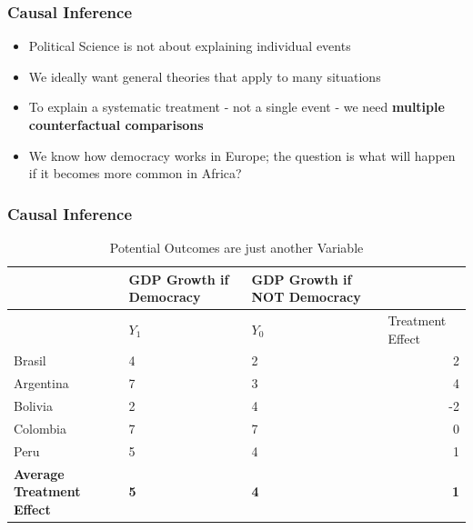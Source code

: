 \documentclass[xcolor=x11names,compress]{beamer}\usepackage[]{graphicx}\usepackage[]{color}
\renewcommand{\(}{\begin{columns}}
\renewcommand{\)}{\end{columns}}
\newcommand{\<}[1]{\begin{column}{#1}}
\renewcommand{\>}{\end{column}}
\begin{document}
\begin{frame}
\frametitle{Causal Inference}
\begin{itemize}
\item Political Science is not about explaining individual events
\pause
\item We ideally want general theories that apply to many situations
\pause
\item To explain a systematic treatment - not a single event - we need \textbf{multiple counterfactual comparisons}
\pause
\item We know how democracy works in Europe; the question is what will happen if it becomes more common in Africa?
\pause
{}
\end{itemize}
\end{frame}

\begin{frame}
\frametitle{Causal Inference}
\footnotesize
\begin{table}[htbp]
  \centering
  \caption{Potential Outcomes are just another Variable}
    \begin{tabular}{|p{2.4cm}|p{2.4cm}|p{2.4cm}|r|}
    \hline
          & \multicolumn{1}{p{2.4cm}|}{GDP Growth if Democracy} & \multicolumn{1}{p{2.4cm}|}{GDP Growth if  NOT Democracy} &  \bigstrut\\
    \hline
          & \multicolumn{1}{p{2.4cm}|}{$Y_1$} & \multicolumn{1}{l|}{$Y_0$} & \multicolumn{1}{l|}{Treatment Effect} \bigstrut\\
    \hline
    Brasil & 4     & 2     & 2 \bigstrut\\
    \hline
    Argentina & 7    & 3     & 4 \bigstrut\\
    \hline
    Bolivia & 2     & 4     & -2 \bigstrut\\
    \hline
    Colombia & 7    & 7    & 0 \bigstrut\\
    \hline
    Peru & 5     & 4     & 1 \bigstrut\\
    \hline
    \textbf{Average Treatment Effect} & \textbf{5} & \textbf{4} & \textbf{1} \bigstrut\\
    \hline
    \end{tabular}%
  \label{tab:addlabel}%
\end{table}%
\normalsize
\end{frame}
\end{document}
